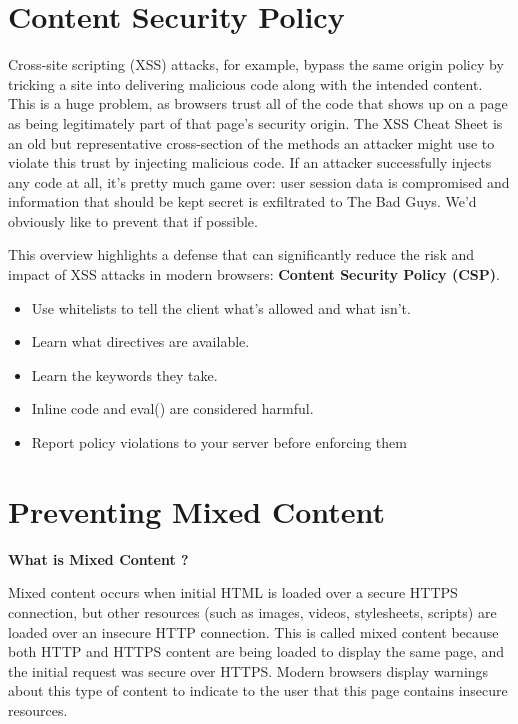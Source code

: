 \documentclass[14pt,a4paper,final]{extreport}
\begin{document}
\section{Content Security Policy}
\item Cross-site scripting (XSS) attacks, for example, bypass the same origin policy by tricking a site into delivering malicious code along with the intended content. This is a huge problem, as browsers trust all of the code that shows up on a page as being legitimately part of that page's security origin. The XSS Cheat Sheet is an old but representative cross-section of the methods an attacker might use to violate this trust by injecting malicious code. If an attacker successfully injects any code at all, it's pretty much game over: user session data is compromised and information that should be kept secret is exfiltrated to The Bad Guys. We'd obviously like to prevent that if possible.
\item This overview highlights a defense that can significantly reduce the risk and impact of XSS attacks in modern browsers: \textbf{Content Security Policy (CSP)}.
\begin{itemize}
    \item Use whitelists to tell the client what's allowed and what isn't.
    \item Learn what directives are available.
    \item Learn the keywords they take.
    \item Inline code and eval() are considered harmful.
    \item Report policy violations to your server before enforcing them
\end{itemize}

\newpage \section{Preventing Mixed Content}
\item \textbf{What is Mixed Content ?}
\item Mixed content occurs when initial HTML is loaded over a secure HTTPS connection, but other resources (such as images, videos, stylesheets, scripts) are loaded over an insecure HTTP connection. This is called mixed content because both HTTP and HTTPS content are being loaded to display the same page, and the initial request was secure over HTTPS. Modern browsers display warnings about this type of content to indicate to the user that this page contains insecure resources.
\end{document}

